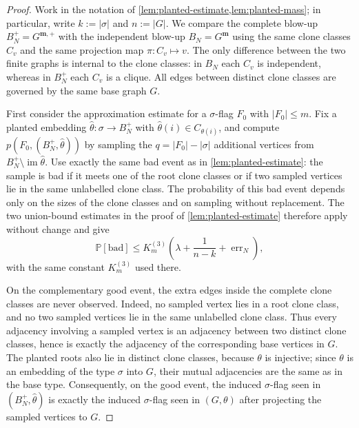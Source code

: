 \documentclass[11pt]{article}
\theoremstyle{definition}
\newcommand{\Prob}{\mathbb{P}}
\begin{document}
\begin{proof}
Work in the notation of
\cref{lem:planted-estimate,lem:planted-mass}; in particular, write
$k:=|\sigma|$ and $n:=|G|$.
We compare the complete blow-up $B_N^+=G^{\mathbf m,+}$ with the independent
blow-up $B_N=G^{\mathbf m}$ using the same clone classes $C_v$ and the same
projection map $\pi:C_v\mapsto v$.  The only difference between the two finite
graphs is internal to the clone classes: in $B_N$ each $C_v$ is independent,
whereas in $B_N^+$ each $C_v$ is a clique.  All edges between distinct clone
classes are governed by the same base graph $G$.

First consider the approximation estimate for a $\sigma$-flag $F_0$ with
$|F_0|\le m$.  Fix a planted embedding $\widehat\theta:\sigma\to B_N^+$ with
$\widehat\theta(i)\in C_{\theta(i)}$, and compute
$p(F_0,(B_N^+,\widehat\theta))$ by sampling the $q=|F_0|-|\sigma|$ additional
vertices from $B_N^+\setminus\operatorname{im}\widehat\theta$.  Use exactly the
same bad event as in \cref{lem:planted-estimate}: the sample is bad if it meets
one of the root clone classes or if two sampled vertices lie in the same
unlabelled clone class.  The probability of this bad event depends only on the
sizes of the clone classes and on sampling without replacement.  The two
union-bound estimates in the proof of \cref{lem:planted-estimate} therefore
apply without change and give
\[
  \Prob[\text{bad}]
  \le
  K_m^{(3)}\left(\lambda+\frac1{n-k}+\operatorname{err}_N\right),
\]
with the same constant $K_m^{(3)}$ used there.

On the complementary good event, the extra edges inside the complete clone
classes are never observed.  Indeed, no sampled vertex lies in a root clone
class, and no two sampled vertices lie in the same unlabelled clone class.
Thus every adjacency involving a sampled vertex is an adjacency between two
distinct clone classes, hence is exactly the adjacency of the corresponding base
vertices in $G$.  The planted roots also lie in distinct clone
classes, because $\theta$ is injective; since $\theta$ is an embedding of
the type $\sigma$ into $G$, their mutual adjacencies are the same as in the base
type.
Consequently, on the good event, the induced $\sigma$-flag seen in
$(B_N^+,\widehat\theta)$ is exactly the induced $\sigma$-flag seen in
$(G,\theta)$ after projecting the sampled vertices to $G$.


\end{proof}
\end{document}
